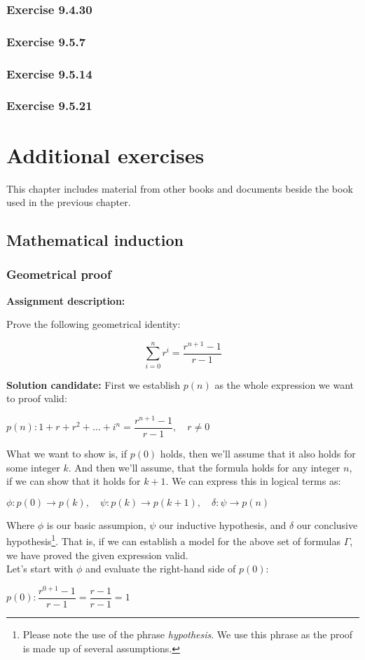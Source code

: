 \documentclass{report}
\newcommand{\cent}[1]{\begin{center}#1\end{center}}
\newcommand{\assignmentDescription}{\textbf{Assignment description: }}
\newcommand{\solution}{\textbf{Solution candidate: }}
\newcommand{\Exercise}[1]{\subsection{Exercise #1}}
\begin{document}
 	\Exercise{9.4.30}
 	
 	\Exercise{9.5.7}
 	\Exercise{9.5.14}
 	\Exercise{9.5.21}
 	\chapter{Additional exercises}
 	
 	This chapter includes material from other books and documents beside the book used in the previous chapter.
 	
 	\pagebreak
 	
 	\section{Mathematical induction}
 	
 	\subsection{Geometrical proof}
 	
 	\assignmentDescription
 	
 	Prove the following geometrical identity:
 	
 	\cent{$$\sum_{i=0}^{n} r^i = \dfrac{r^{n+1} - 1}{r-1}$$}
 	
 	\solution
	First we establish $p(n)$ as the whole expression we want to proof valid:
	
	\cent{$p(n) : 1 + r + r^2 + \dots + i^n = \dfrac{r^{n+1} - 1}{r-1}, \quad r \neq 0$}
	 	
 	What we want to show is, if $p(0)$ holds, then we'll assume that it also holds for some integer $k$. And then we'll assume, that the formula holds for any integer $n$, if we can show that it holds for $k+1$. We can express this in logical terms as:
 	
 	\cent{$\phi : p(0) \to p(k), \quad \psi : p(k) \to p(k+1), \quad \delta : \psi \to p(n)$}
 	
 	Where $\phi$ is our basic assumpion, $\psi$ our inductive hypothesis, and $\delta$ our conclusive hypothesis\footnote{Please note the use of the phrase \textit{hypothesis}. We use this phrase as the proof is made up of several assumptions.}. That is, if we can establish a model for the above set of formulas $\Gamma$, we have proved the given expression valid.\\
 	
 	Let's start with $\phi$ and evaluate the right-hand side of $p(0)$:
 	
 	\cent{$p(0) : \dfrac{r^{0+1} - 1}{r-1} = \dfrac{r-1}{r-1} = 1$}
 	
\end{document}
